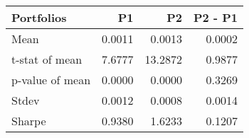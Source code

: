 \begin{tabular}{lrrr}
\toprule
Portfolios & P1 & P2 & P2 - P1 \\
\midrule
Mean & 0.0011 & 0.0013 & 0.0002 \\
t-stat of mean & 7.6777 & 13.2872 & 0.9877 \\
p-value of mean & 0.0000 & 0.0000 & 0.3269 \\
Stdev & 0.0012 & 0.0008 & 0.0014 \\
Sharpe & 0.9380 & 1.6233 & 0.1207 \\
\bottomrule
\end{tabular}
